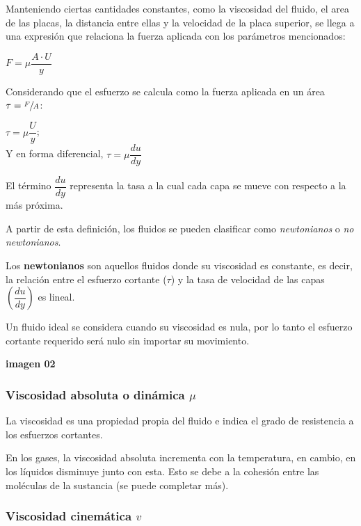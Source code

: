 Manteniendo ciertas cantidades constantes, como la viscosidad del fluido, el area de las placas, la distancia entre ellas y la velocidad de la placa superior, se llega a una expresión que relaciona la fuerza aplicada con los parámetros mencionados:
\begin{center}
	$F = \mu \dfrac{A \cdot U}{y}$
\end{center}

Considerando que el esfuerzo se calcula como la fuerza aplicada en un área $\tau = \sfrac{F}{A}$:
\begin{center}
	$\tau = \mu \dfrac{U}{y}$;\\ Y en forma diferencial, $\tau = \mu \dfrac{du}{dy}$
\end{center}

El término $\dfrac{du}{dy}$ representa la tasa a la cual cada capa se mueve con respecto a la más próxima.\\ \vspace{.5cm}

A partir de esta definición, los fluidos se pueden clasificar como \textit{newtonianos} o \textit{no newtonianos}.


Los \textbf{newtonianos} son aquellos fluidos donde su viscosidad es constante, es decir, la relación entre el esfuerzo cortante ($\tau$) y la tasa de velocidad de las capas $\left(\dfrac{du}{dy}\right)$ es lineal.

Un fluido ideal se considera cuando su viscosidad es nula, por lo tanto el esfuerzo cortante requerido será nulo sin importar su movimiento.

\begin{center}
	\textbf{imagen 02}
\end{center}

\subsubsection{Viscosidad absoluta o dinámica $\mu$}
La viscosidad es una propiedad propia del fluido e indica el grado de resistencia a los esfuerzos cortantes.

En los gases, la viscosidad absoluta incrementa con la temperatura, en cambio, en los líquidos disminuye junto con esta. Esto se debe a la cohesión entre las moléculas de la sustancia (se puede completar más).

\subsubsection{Viscosidad cinemática $v$}

